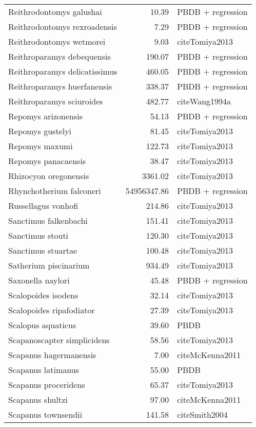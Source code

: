 \begin{table}[ht]
\begin{tabular}{lrl}
  Reithrodontomys galushai & 10.39 & PBDB + regression \\ 
  Reithrodontomys rexroadensis & 7.29 & PBDB + regression \\ 
  Reithrodontomys wetmorei & 9.03 & cite{Tomiya2013} \\ 
  Reithroparamys debequensis & 190.07 & PBDB + regression \\ 
  Reithroparamys delicatissimus & 460.05 & PBDB + regression \\ 
  Reithroparamys huerfanensis & 338.37 & PBDB + regression \\ 
  Reithroparamys sciuroides & 482.77 & cite{Wang1994a} \\ 
  Repomys arizonensis & 54.13 & PBDB + regression \\ 
  Repomys gustelyi & 81.45 & cite{Tomiya2013} \\ 
  Repomys maxumi & 122.73 & cite{Tomiya2013} \\ 
  Repomys panacaensis & 38.47 & cite{Tomiya2013} \\ 
  Rhizocyon oregonensis & 3361.02 & cite{Tomiya2013} \\ 
  Rhynchotherium falconeri & 54956347.86 & PBDB + regression \\ 
  Russellagus vonhofi & 214.86 & cite{Tomiya2013} \\ 
  Sanctimus falkenbachi & 151.41 & cite{Tomiya2013} \\ 
  Sanctimus stouti & 120.30 & cite{Tomiya2013} \\ 
  Sanctimus stuartae & 100.48 & cite{Tomiya2013} \\ 
  Satherium piscinarium & 934.49 & cite{Tomiya2013} \\ 
  Saxonella naylori & 45.48 & PBDB + regression \\ 
  Scalopoides isodens & 32.14 & cite{Tomiya2013} \\ 
  Scalopoides ripafodiator & 27.39 & cite{Tomiya2013} \\ 
  Scalopus aquaticus & 39.60 & PBDB \\ 
  Scapanoscapter simplicidens & 58.56 & cite{Tomiya2013} \\ 
  Scapanus hagermanensis & 7.00 & cite{McKenna2011} \\ 
  Scapanus latimanus & 55.00 & PBDB \\ 
  Scapanus proceridens & 65.37 & cite{Tomiya2013} \\ 
  Scapanus shultzi & 97.00 & cite{McKenna2011} \\ 
  Scapanus townsendii & 141.58 & cite{Smith2004} \\ 

\end{tabular}
\end{table}
